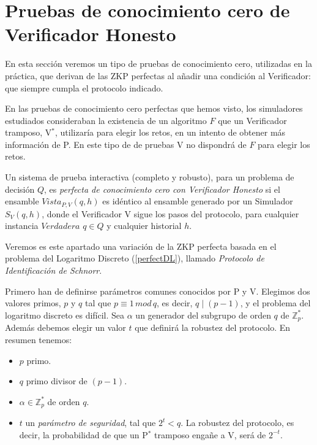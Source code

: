 \hfil




\section{Pruebas de conocimiento cero de Verificador Honesto}\label{honestVer:sec}



En esta sección veremos un tipo de pruebas de conocimiento cero, utilizadas en la práctica, que derivan de las ZKP perfectas al añadir una condición al Verificador: que siempre cumpla el protocolo indicado.

En las pruebas de conocimiento cero perfectas que hemos visto, los simuladores estudiados consideraban la existencia de un algoritmo $F$ que un Verificador tramposo, V$^*$, utilizaría para elegir los retos, en un intento de obtener más información de P. En este tipo de de pruebas V no dispondrá de $F$ para elegir los retos.


\begin{definition}
	\hfil
	
	Un sistema de prueba interactiva (completo y robusto), para un problema de decisión $Q$, es \textit{perfecta de conocimiento cero con Verificador Honesto} si el ensamble $Vista_{P,V}(q,h)$ es idéntico al ensamble generado por un Simulador $S_{V}(q,h)$, donde el Verificador V sigue los pasos del protocolo, para cualquier instancia $Verdadera$ $q\in Q$ y cualquier historial $h$.
\end{definition}

\hfil

Veremos es este apartado una variación de la ZKP perfecta basada en el problema del Logaritmo Discreto (\ref{perfectDL}), llamado \textit{Protocolo de Identificación de Schnorr}.

Primero han de definirse parámetros comunes conocidos por P y V. Elegimos dos valores primos, $p$ y $q$ tal que $p\equiv 1 \, mod \, q$, es decir, $q\mid (p-1)$, y el problema del logaritmo discreto es difícil. Sea $\alpha$ un generador del subgrupo de orden $q$ de $\mathbb{Z}_p^*$. Además debemos elegir un valor $t$ que definirá la robustez del protocolo. En resumen tenemos:

\begin{itemize}
	\item $p$ primo.
	\item $q$ primo divisor de $(p-1)$.
	\item $\alpha \in \mathbb{Z}_p^*$ de orden $q$.
	\item $t$ un \textit{parámetro de seguridad}, tal que $2^t < q$. La robustez del protocolo, es decir, la probabilidad de que un P$^*$ tramposo engañe a V, será de $2^{-t}$.
\end{itemize}


